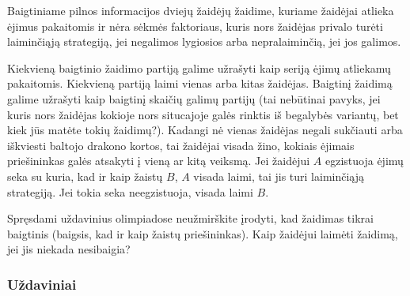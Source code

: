 \begin{thm}[Zermelo]
Baigtiniame pilnos informacijos dviejų žaidėjų žaidime, kuriame žaidėjai
atlieka ėjimus pakaitomis ir nėra sėkmės faktoriaus, kuris nors žaidėjas
privalo turėti laiminčiąją strategiją, jei negalimos lygiosios arba
nepralaiminčią, jei jos galimos. 
\end{thm}

Kiekvieną baigtinio žaidimo partiją galime užrašyti kaip seriją ėjimų
atliekamų pakaitomis. Kiekvieną partiją laimi vienas arba kitas žaidėjas.
Baigtinį žaidimą galime užrašyti kaip baigtinį skaičių galimų partijų
(tai nebūtinai pavyks, jei kuris nors žaidėjas kokioje nors situcajoje
galės rinktis iš  begalybės variantų, bet kiek jūs matėte tokių žaidimų?).
Kadangi nė vienas žaidėjas negali  sukčiauti arba iškviesti baltojo drakono
kortos, tai žaidėjai visada žino, kokiais ėjimais priešininkas galės
atsakyti į vieną ar kitą veiksmą. Jei žaidėjui $A$ egzistuoja ėjimų seka su
kuria, kad ir kaip žaistų $B$, $A$ visada laimi, tai jis turi laiminčiąją
strategiją. Jei tokia seka neegzistuoja, visada laimi $B$. 

\begin{pastaba}
Spręsdami uždavinius olimpiadose neužmirškite įrodyti, kad žaidimas tikrai
baigtinis (baigsis, kad ir kaip žaistų priešininkas). Kaip žaidėjui laimėti
žaidimą, jei jis niekada nesibaigia?
\end{pastaba}

\subsubsection{Uždaviniai}

